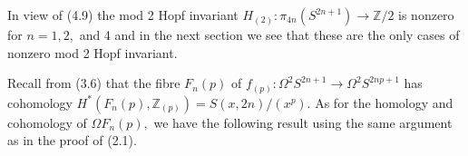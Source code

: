 In view of (4.9) the mod 2 Hopf invariant $H_{(2)}: \pi_{4n}(S^{2n+1}) \to \mathbb{Z}/2$ is nonzero for $n = 1, 2,$ and 4 and in the next section we see that these are the only cases of nonzero mod 2 Hopf invariant.

Recall from (3.6) that the fibre $F_n(p)$ of $f_{(p)}: \Omega^2 S^{2n+1} \to \Omega^2 S^{2np+1}$ has cohomology $H^*(F_n(p), \mathbb{Z}_{(p)}) = S(x, 2n)/(x^p)$. As for the homology and cohomology of $\Omega F_n(p),$ we have the following result using the same argument as in the proof of (2.1).
